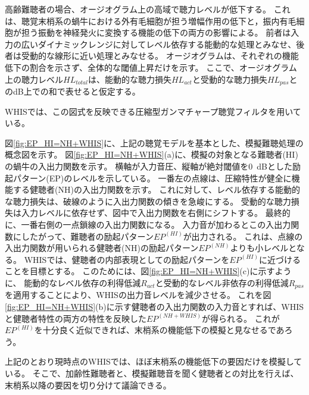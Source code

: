 高齢難聴者の場合、オージオグラム上の高域で聴力レベルが低下する。
これは、聴覚末梢系の蝸牛における外有毛細胞が担う増幅作用の低下と，振内有毛細胞が担う振動を神経発火に変換する機能の低下の両方の影響による。
前者は入力の広いダイナミックレンジに対してレベル依存する能動的な処理とみなせ、後者は受動的な線形に近い処理とみなせる。
オージオグラムは、それぞれの機能低下の割合を示さず、全体的な閾値上昇だけを示す。
ここで、オージオグラム上の聴力レベル$HL_{total}$は、能動的な聴力損失$HL_{act}$と受動的な聴力損失$HL_{pas}$とのdB上での和で表せると仮定する\cite{moore1997model}。

WHISでは、この図式を反映できる圧縮型ガンマチャープ聴覚フィルタ\cite{irino2001compressive,irino2006dynamic}を用いている。


図\ref{fig:EP_HI=NH+WHIS}に、上記の聴覚モデルを基本とした、模擬難聴処理の概念図を示す。
図\ref{fig:EP_HI=NH+WHIS}(a)に、模擬の対象となる難聴者(HI)の蝸牛の入出力関数を示す。
横軸が入力音圧、縦軸が絶対閾値を0~dBとした励起パターン(EP)のレベルを示している。
一番左の点線は、圧縮特性が健全に機能する健聴者(NH)の入出力関数を示す。
これに対して、レベル依存する能動的な聴力損失は、破線のように入出力関数の傾きを急峻にする。
受動的な聴力損失は入力レベルに依存せず、図中で入出力関数を右側にシフトする。
最終的に、一番右側の一点鎖線の入出力関数になる。
入力音が加わるとこの入出力関数にしたがって、難聴者の励起パターン$EP^{(HI)}$が出力される。
これは、点線の入出力関数が用いられる健聴者(NH)の励起パターン$EP^{(NH)}$よりも小レベルとなる。
WHISでは、健聴者の内部表現としての励起パターンを$EP^{(HI)}$に近づけることを目標とする。
このためには、図\ref{fig:EP_HI=NH+WHIS}(c)に示すように、
能動的なレベル依存の利得低減$R_{act}$と受動的なレベル非依存の利得低減$R_{pas}$を適用することにより、WHISの出力音レベルを減少させる。
これを図\ref{fig:EP_HI=NH+WHIS}(b)に示す健聴者の入出力関数の入力音とすれば、WHISと健聴者特性の両方の特性を反映した$EP^{(NH+WHIS)}$が得られる。
これが$EP^{(HI)}$を十分良く近似できれば、末梢系の機能低下の模擬と見なせるであろう。

上記のとおり現時点のWHISでは、ほぼ末梢系の機能低下の要因だけを模擬している。
そこで、加齢性難聴者と、模擬難聴音を聞く健聴者との対比を行えば、末梢系以降の要因を切り分けて議論できる。

